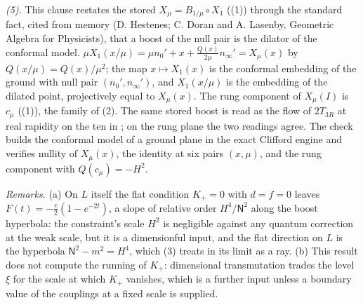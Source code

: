 \emph{(5).} This clause restates the stored $X_{\mu} = B_{1/\mu}\circ X_{1}$ ((1)) through the standard fact, cited from memory (D. Hestenes; C. Doran and A. Lasenby, Geometric Algebra for Physicists), that a boost of the null pair is the dilator of the conformal model. $\mu X_{1}(x/\mu) = \mu n_{0}' + x + \tfrac{Q(x)}{2\mu}n_{\infty}' = X_{\mu}(x)$ by $Q(x/\mu) = Q(x)/\mu^{2}$; the map $x \mapsto X_{1}(x)$ is the conformal embedding of the ground with null pair $(n_{0}', n_{\infty}')$, and $X_{1}(x/\mu)$ is the embedding of the dilated point, projectively equal to $X_{\mu}(x)$. The rung component of $X_{\mu}(I)$ is $c_{\mu}$ ((1)), the family of (2). The same stored boost is read as the flow of $2T_{3R}$ at real rapidity on the ten in ; on the rung plane the two readings agree. The check builds the conformal model of a ground plane in the exact Clifford engine and verifies nullity of $X_{\mu}(x)$, the identity at six pairs $(x, \mu)$, and the rung component with $Q(c_{\mu}) = -H^{2}$.

\emph{Remarks.} (a) On $L$ itself the flat condition $K_{+} = 0$ with $d = f = 0$ leaves $F(t) = -\tfrac{e}{2}(1 - e^{-2t})$, a slope of relative order $H^{4}/\mathsf{N}^{2}$ along the boost hyperbola: the constraint's scale $H^{2}$ is negligible against any quantum correction at the weak scale, but it is a dimensionful input, and the flat direction on $L$ is the hyperbola $\mathsf{N}^{2} - m^{2} = H^{4}$, which (3) treats in its limit as a ray. (b) This result does not compute the running of $K_{+}$: dimensional transmutation trades the level $\xi$ for the scale at which $K_{+}$ vanishes, which is a further input unless a boundary value of the couplings at a fixed scale is supplied.
